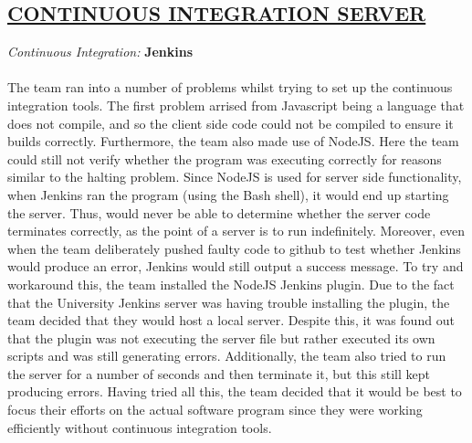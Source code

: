 \documentclass[paper=a4,fontsize=11pt]{article}
\newcommand{\SectionPart}[1]{\subsection*{\uppercase{#1}}}
\begin{document}
\SectionPart{\ul{Continuous Integration Server}}
\hfill \textit{Continuous Integration:} \textbf{Jenkins} \\
\\
The team ran into a number of problems whilst trying to set up the continuous integration tools.
The first problem arrised from Javascript being a language that does not compile, and so
the client side code could not be compiled to ensure it
builds correctly. Furthermore, the team also made use of NodeJS. Here
the team could still not verify whether the program was executing correctly for reasons
similar to the halting problem. Since NodeJS is used for server side
functionality, when Jenkins ran the program (using the Bash shell), it would end
up starting the server. Thus, would never be able to determine whether the server
code terminates correctly, as the point of a server is to run indefinitely.
Moreover, even when the team deliberately pushed faulty code to github to test whether Jenkins would produce an error,
Jenkins would still output a success message.
To try and workaround this, the team installed the NodeJS Jenkins plugin.
Due to the fact that the University Jenkins server was having trouble installing the plugin,
the team decided that they would host a local server. Despite this, it was found out that the plugin was not executing the server file
but rather executed its own scripts and was still generating errors.
Additionally, the team also tried to run the server for a number of seconds and then terminate it, but this still kept producing errors.
Having tried all this, the team decided that it would be best to focus their efforts on the actual software program
since they were working efficiently without continuous integration tools.\\
\end{document}
